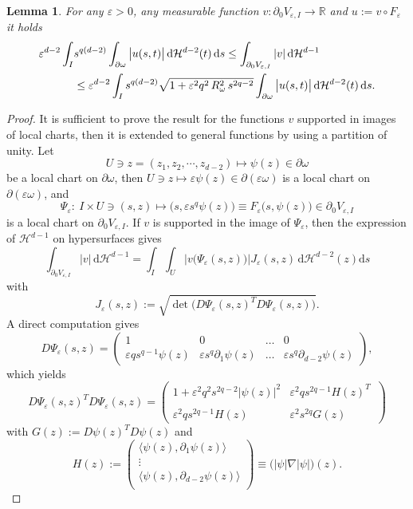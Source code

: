 \documentclass[11pt,oneside,reqno,a4paper]{amsart}
\newcommand{\dd}{\mathrm{d}}
\newcommand{\R}{\mathbb{R}}
\renewcommand{\H}{\mathcal{H}}
\newcommand{\eps}{\varepsilon}
\newtheorem{lemma}[theorem]{Lemma}
\theoremstyle{definition}
\begin{document}
\begin{lemma}\label{two side est of bdy integral}
	For any $\eps>0$, any measurable function $v:\partial_0 V_{\eps,I}\to\R$ and $u:=v\circ F_\eps$ it holds
	\begin{align*}\label{bdy integral est0}
		\eps^{d-2}\int_I&s^{q(d-2)}\int_{\partial\omega}\big|u(s,t)\big|\,\dd\H^{d-2}(t)\,\dd s\leq
		\int_{\partial_0 V_{\eps,I}}|v|\,\dd\H^{d-1}\\
		&\leq\eps^{d-2}\int_I
		s^{q(d-2)}\sqrt{1+\eps^2q^2\,R_\omega^2\,s^{2q-2}}\int_{\partial\omega}\big|u(s,t)\big|\,\dd\H^{d-2}(t)\,\dd s\notag.
	\end{align*}
\end{lemma}
\begin{proof}
	It is sufficient to prove the result for the functions $v$ supported in images of  local charts, then it is extended to general functions by using a partition of unity. Let
	\[
	U\ni z=(z_1,z_2,\cdots,z_{d-2})\mapsto\psi(z)\in \partial\omega
	\]
	be a local chart on $\partial\omega$, then $U\ni z\mapsto\eps\psi(z)\in \partial(\eps\omega)$
	is a local chart on $\partial(\eps\omega)$, and
	\[
	\Psi_\eps:\ I\times U\ni(s,z)\mapsto\big(s, \eps s^q \psi(z)\big)\equiv F_\eps\big(s,\psi(z)\big)\in\partial_0 V_{\eps,I}
	\]
	is a local chart on $\partial_0 V_{\eps,I}$. If $v$ is supported in the image of $\Psi_\eps$, then the expression of $\H^{d-1}$ on hypersurfaces gives
	\begin{equation}\label{bdy integral est}
		\int_{\partial_0 V_{\eps,I}}|v|\,\dd\H^{d-1}=\int_I\int_{U}\Big|v\big(\Psi_\eps(s,z)\big)\Big|J_\eps(s,z)\,\dd\H^{d-2}(z)\dd s
	\end{equation}
	with
	\[
	J_\eps(s,z):=\sqrt{\det\big(D\Psi_\eps(s,z)^TD\Psi_\eps(s,z)\big)}.
	\]
	A direct computation gives
	\[
	D\Psi_\eps(s,z)=\begin{pmatrix}
		1 & 0 & \dots & 0\\
		\eps q s^{q-1}\psi(z) & \eps s^q \partial_1 \psi(z) & \dots & \eps s^q \partial_{d-2}\psi(z)
	\end{pmatrix},
	\]
	which yields
	\[
	D\Psi_\eps(s,z)^TD\Psi_\eps(s,z)=
	\begin{pmatrix}
		1+\eps^2q^2s^{2q-2}\big|\psi(z)\big|^2 & \eps^2qs^{2q-1}H(z)^T\,\\
		\\
		\eps^2qs^{2q-1}H(z) & \eps^2s^{2q}G(z)
	\end{pmatrix}
	\]
	with $G(z):=D\psi(z)^T D\psi(z)$ and
	\[		
	H(z):=
	\begin{pmatrix}
		\big\langle\psi(z), \partial_1\psi(z)\big\rangle\\
		\vdots\\
		\big\langle\psi(z), \partial_{d-2}\psi(z)\big\rangle\\
	\end{pmatrix}
	\equiv\Big(|\psi|\nabla|\psi|\Big)(z).
	\]
	

\end{proof}
\end{document}
